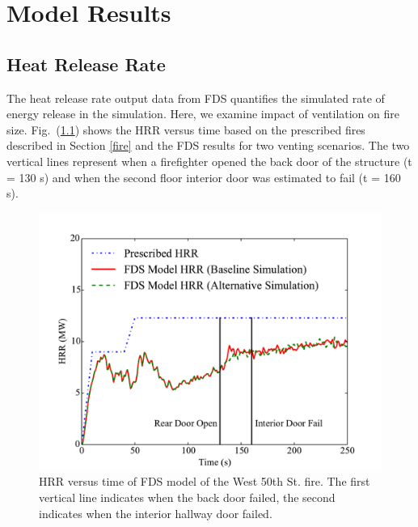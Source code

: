 \documentclass[11pt,oneside]{book}
\begin{document}
\chapter{Model Results}
\label{results}

\section{Heat Release Rate}
\label{HRR}
The heat release rate output data from FDS quantifies the simulated rate of energy release in the simulation. Here, we examine impact of ventilation on fire size. Fig.~(\ref{fig:hrr}) shows the HRR versus time based on the prescribed fires described in Section \ref{fire} and the FDS results for two venting scenarios. The two vertical lines represent when a firefighter opened the back door of the structure (t = 130 s) and when the second floor interior door was estimated to fail (t = 160 s).

\begin{figure}[h!]
\centering
\includegraphics[width=.80\textwidth]{../Figures/Chicago_Fire_HRR}
\caption{HRR versus time of FDS model of the West 50th St. fire. The first vertical line indicates when the back door failed, the second indicates when the interior hallway door failed.}
\label{fig:hrr}
\end{figure}
\end{document}
